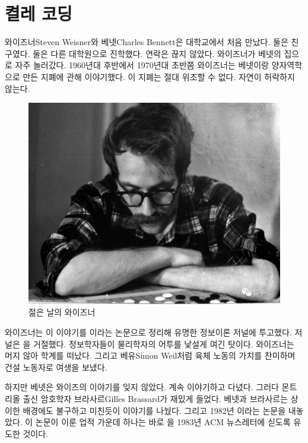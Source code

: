 \documentclass[a4paper,chapter,atbegshi]{oblivoir}
\begin{document}
\chapter{켤레 코딩}
와이즈너{\tiny Steven Weisner}와 베넷{\tiny Charles Bennett}은 대학교에서
처음 만났다. 둘은 친구였다. 둘은 다른 대학원으로 진학했다. 연락은 끊지
않았다. 와이즈너가 베넷의 집으로 자주 놀러갔다. 1960년대 후반에서
1970년대 초반쯤 와이즈너는 베넷이랑 양자역학으로 만든 지폐에 관해
이야기했다. 이 지폐는 절대 위조할 수 없다. 자연이 허락하지 않는다. 
\begin{figure}[h]\centering
  \includegraphics[scale=0.2]{weizner}
  \caption{젊은 날의 와이즈너}
\end{figure}

\noindent
와이즈너는 이 이야기를 이라는 논문으로
정리해 유명한 정보이론 저널에 투고했다. 저널은 을 거절했다.
정보학자들이 물리학자의 어투를 낯설게 여긴 탓이다. 와이즈너는 머지 않아 학계를
떠났다. 그리고 베유{\tiny Simon Weil}처럼 육체 노동의 가치를 찬미하며 건설
노동자로 여생을 보냈다.

하지만 베넷은 와이즈의 이야기를 잊지 않았다. 계속 이야기하고 다녔다. 그러다 
몬트리올 출신 암호학자 브라사르{\tiny Gilles Brassard}가 재밌게 들었다. 
베넷과 브라사르는 상이한 배경에도 불구하고 미친듯이 이야기를 나눴다. 
그리고 1982년 이라는 논문을 내놓았다. 
이 논문이 이룬 업적 가운데 하나는 바로 을 1983년 ACM 뉴스레터에
싣도록 유도한 것이다. 
\end{document}

